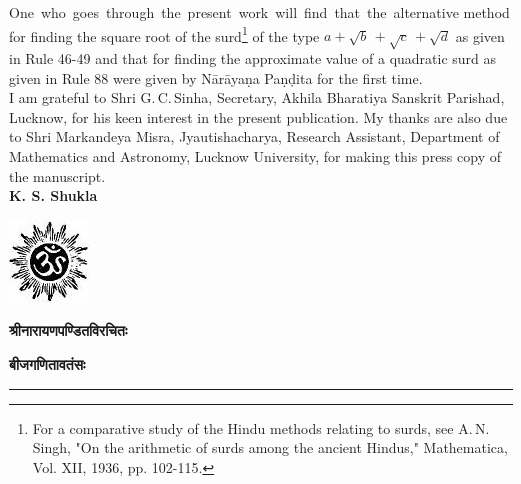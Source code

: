 \documentclass[11pt, openany]{book}
\begin{document}
One \,who \,goes \,through \,the \,present \,work \,will \,find \,that \,the \,alternative method for finding the square root of the surd\footnote{For a comparative study of the Hindu methods relating to surds, see A.\,N.\,Singh, "On the arithmetic of surds among the ancient Hindus," Mathematica, Vol. XII, 1936, pp. 102-115.} of the type $a + \sqrt{b} \,+ \sqrt{c} \,+ \sqrt{d}$ as given in Rule 46-49 and that for finding the approximate value of a quadratic surd as given in Rule 88 were given by Nārāyaṇa Paṇḍita for the first time.\\

I am grateful to Shri G.\,C.\,Sinha, Secretary, Akhila Bharatiya Sanskrit Parishad, Lucknow, for his keen interest in the present publication. My thanks are also due to Shri Markandeya Misra, Jyautishacharya, Research Assistant, Department of Mathematics and Astronomy, Lucknow University, for making this press copy of the manuscript.\\

\hfill \textbf{K. S. Shukla}

\newpage
{}
\thispagestyle{empty}
\begin{center}
\includegraphics[scale=0.7]{fig2.jpeg}
\vspace{8mm}

{\large{\textbf{श्रीनारायणपण्डितविरचितः}}}
\vspace{4mm}

{\Large{\textbf{बीजगणितावतंसः}}}
\vspace{2mm}

\rule{0.5\linewidth}{0.5pt}
\end{center}
\end{document}
